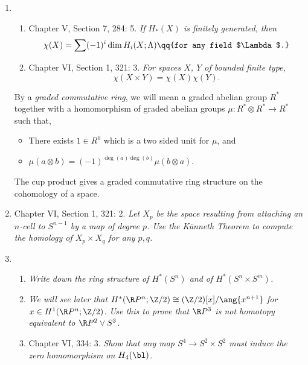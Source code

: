 \documentclass[onesided]{ccg-pset}
\author{Colton Grainger}
\date{\today}
\begin{document}
\maketitle

\begin{enumerate}
\item 
    \begin{enumerate}
        \item Chapter V, Section 7, 284: 5. \textit{If $H_*(X)$ is finitely generated, then 
            \[
                \chi(X) = \sum (-1)^i \dim H_i(X; \Lambda) \qq{for any field $\Lambda$.}
           \]}
       \item Chapter VI, Section 1, 321: 3. \textit{For spaces $X$, $Y$ of bounded finite type, 
           \[
               \chi(X \times Y) = \chi(X)\chi(Y).
           \]}
    \end{enumerate}

 \newpage

 \begin{note}
    By a \emph{graded commutative ring}, we will mean a graded abelian group $R^*$ together with a homomorphism of graded abelian groups $\mu \colon R^* \otimes R^* \to R^*$ such that,
    \begin{itemize}
       \item There exists $1 \in R^0$ which is a two sided unit for $\mu$, and
       \item $\mu (a\otimes b) = (-1)^{\deg(a)\deg(b)} \mu(b\otimes a)$.
    \end{itemize}
    The cup product gives a graded commutative ring structure on the cohomology of a space. 
\end{note}

\item Chapter VI, Section 1, 321: 2. 
    \textit{Let $X_p$ be the space resulting from attaching an $n$-cell to $S^{n-1}$ by a map of degree $p$. Use the Künneth Theorem to compute the homology of $X_p \times X_q$ for any $p, q$.}


\newpage

\item 
    \begin{enumerate}
        \item \textit{Write down the ring structure of $H^*(S^n)$ and of $H^*(S^n \times S^m)$.}        
        \item \textit{We will see later that $H^*(\R P^n ; \Z/2) \cong (\Z/2)[x]/\ang{ x^{n+1} }$ for $x \in H^1(\R P^n ; \Z/2)$. Use this to prove that $\R P^3$ is not homotopy equivalent to $\R P^2 \vee S^3$.}
        \item Chapter VI, 334: 3. \textit{Show that any map $S^4 \to S^2 \times S^2$ must induce the zero homomorphism on $H_4(\bl)$.}
\end{enumerate}


\end{enumerate}
\end{document}
